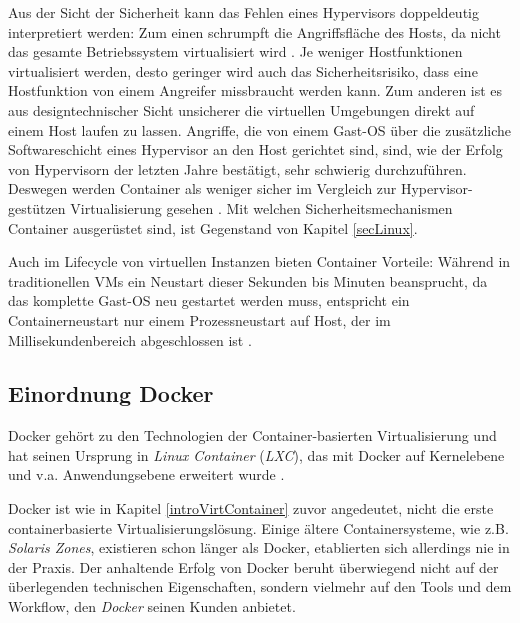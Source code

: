 \documentclass[../main.tex]{subfiles}
\begin{document}
      Aus der Sicht der Sicherheit kann das Fehlen eines Hypervisors doppeldeutig interpretiert werden: Zum einen schrumpft die Angriffsfläche des Hosts, da nicht das gesamte Betriebssystem virtualisiert wird \cite[S.6]{dockerBook}. Je weniger Hostfunktionen virtualisiert werden, desto geringer wird auch das Sicherheitsrisiko, dass eine Hostfunktion von einem Angreifer missbraucht werden kann. Zum anderen ist es aus designtechnischer Sicht unsicherer die virtuellen Umgebungen direkt auf einem Host laufen zu lassen. Angriffe, die von einem Gast-\acrshort{OS} über die zusätzliche Softwareschicht eines Hypervisor an den Host gerichtet sind, sind, wie der Erfolg von Hypervisorn der letzten Jahre bestätigt, sehr schwierig durchzuführen.
			Deswegen werden Container als weniger sicher im Vergleich zur Hypervisor-gestützen Virtualisierung gesehen \cite[S.6]{dockerBook}. Mit welchen Sicherheitsmechanismen Container ausgerüstet sind, ist Gegenstand von Kapitel \ref{secLinux}.


			Auch im Lifecycle von virtuellen Instanzen bieten Container Vorteile: Während in traditionellen \acrshort{VM}s ein Neustart dieser Sekunden bis Minuten beansprucht, da das komplette Gast-\acrshort{OS} neu gestartet werden muss, entspricht ein Containerneustart nur einem Prozessneustart auf Host, der im Millisekundenbereich abgeschlossen ist \cite[S.2]{dockerLXCKub}.

	  \subsection{Einordnung Docker}
      Docker gehört zu den Technologien der Container-basierten Virtualisierung und hat seinen Ursprung in \emph{Linux Container} (\emph{LXC}), das mit Docker auf Kernelebene und v.a. Anwendungsebene erweitert wurde \cite[S.7]{dockerBook}\cite[S.1]{containerVirtPerformance}\cite[S.2]{dockerLXCKub}.


      Docker ist wie in Kapitel \ref{introVirtContainer} zuvor angedeutet, nicht die erste containerbasierte Virtualisierungslösung. Einige ältere Containersysteme, wie z.B. \emph{Solaris Zones}, existieren schon länger als Docker, etablierten sich allerdings nie in der Praxis. Der anhaltende Erfolg von Docker beruht überwiegend nicht auf der überlegenden technischen Eigenschaften, sondern vielmehr auf den Tools und dem Workflow, den \emph{Docker} seinen Kunden anbietet.
\end{document}
